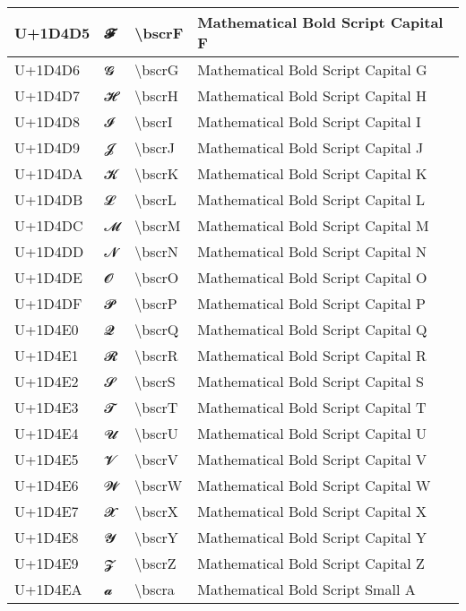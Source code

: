 \begin{table}[h]
\begin{tabulary}{\linewidth}{|L|L|L|L|}
\hline
U+1D4D5 & 𝓕 & {\textbackslash}bscrF & Mathematical Bold Script Capital F \\
\hline
U+1D4D6 & 𝓖 & {\textbackslash}bscrG & Mathematical Bold Script Capital G \\
\hline
U+1D4D7 & 𝓗 & {\textbackslash}bscrH & Mathematical Bold Script Capital H \\
\hline
U+1D4D8 & 𝓘 & {\textbackslash}bscrI & Mathematical Bold Script Capital I \\
\hline
U+1D4D9 & 𝓙 & {\textbackslash}bscrJ & Mathematical Bold Script Capital J \\
\hline
U+1D4DA & 𝓚 & {\textbackslash}bscrK & Mathematical Bold Script Capital K \\
\hline
U+1D4DB & 𝓛 & {\textbackslash}bscrL & Mathematical Bold Script Capital L \\
\hline
U+1D4DC & 𝓜 & {\textbackslash}bscrM & Mathematical Bold Script Capital M \\
\hline
U+1D4DD & 𝓝 & {\textbackslash}bscrN & Mathematical Bold Script Capital N \\
\hline
U+1D4DE & 𝓞 & {\textbackslash}bscrO & Mathematical Bold Script Capital O \\
\hline
U+1D4DF & 𝓟 & {\textbackslash}bscrP & Mathematical Bold Script Capital P \\
\hline
U+1D4E0 & 𝓠 & {\textbackslash}bscrQ & Mathematical Bold Script Capital Q \\
\hline
U+1D4E1 & 𝓡 & {\textbackslash}bscrR & Mathematical Bold Script Capital R \\
\hline
U+1D4E2 & 𝓢 & {\textbackslash}bscrS & Mathematical Bold Script Capital S \\
\hline
U+1D4E3 & 𝓣 & {\textbackslash}bscrT & Mathematical Bold Script Capital T \\
\hline
U+1D4E4 & 𝓤 & {\textbackslash}bscrU & Mathematical Bold Script Capital U \\
\hline
U+1D4E5 & 𝓥 & {\textbackslash}bscrV & Mathematical Bold Script Capital V \\
\hline
U+1D4E6 & 𝓦 & {\textbackslash}bscrW & Mathematical Bold Script Capital W \\
\hline
U+1D4E7 & 𝓧 & {\textbackslash}bscrX & Mathematical Bold Script Capital X \\
\hline
U+1D4E8 & 𝓨 & {\textbackslash}bscrY & Mathematical Bold Script Capital Y \\
\hline
U+1D4E9 & 𝓩 & {\textbackslash}bscrZ & Mathematical Bold Script Capital Z \\
\hline
U+1D4EA & 𝓪 & {\textbackslash}bscra & Mathematical Bold Script Small A \\

\end{tabulary}
\end{table}
